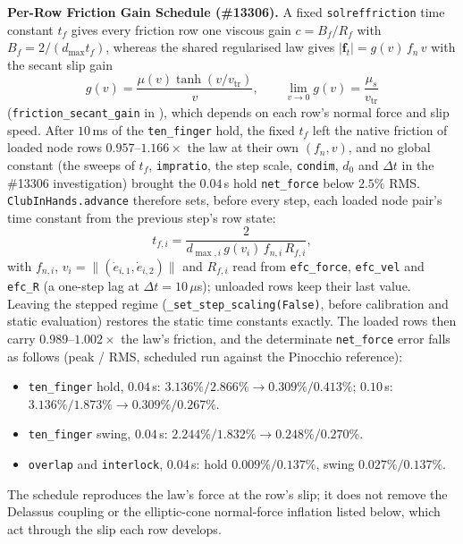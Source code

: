 \documentclass[11pt,a4paper]{article}
\begin{document}
\textbf{Per-Row Friction Gain Schedule (\#13306).} A fixed \texttt{solreffriction} time constant $t_f$ gives every
friction row one viscous gain $c = B_f/R_f$ with $B_f = 2/(d_{\max} t_f)$, whereas the shared regularised law gives
$|\mathbf{f}_t| = g(v)\,f_n\,v$ with the secant slip gain
\begin{equation}
g(v) = \frac{\mu(v)\tanh(v/v_{\mathrm{tr}})}{v}, \qquad \lim_{v \to 0} g(v) = \frac{\mu_s}{v_{\mathrm{tr}}}
\end{equation}
(\texttt{friction\_secant\_gain} in ), which depends on each
row's normal force and slip speed. After $10$\,ms of the \texttt{ten\_finger} hold, the fixed $t_f$ left the native friction
of loaded node rows $0.957$--$1.166\times$ the law at their own $(f_n, v)$, and no global constant (the sweeps of $t_f$,
\texttt{impratio}, the step scale, \texttt{condim}, $d_0$ and $\Delta t$ in the \#13306 investigation) brought the $0.04$\,s
hold \texttt{net\_force} below $2.5\%$ RMS. \texttt{ClubInHands.advance} therefore sets, before every step, each loaded node
pair's time constant from the previous step's row state:
\begin{equation}
t_{f,i} = \frac{2}{d_{\max,i}\, g(v_i)\, f_{n,i}\, R_{f,i}},
\end{equation}
with $f_{n,i}$, $v_i = \|(\dot{e}_{i,1}, \dot{e}_{i,2})\|$ and $R_{f,i}$ read from \texttt{efc\_force}, \texttt{efc\_vel} and
\texttt{efc\_R} (a one-step lag at $\Delta t = 10\,\mu$s); unloaded rows keep their last value. Leaving the stepped regime
(\texttt{\_set\_step\_scaling(False)}, before calibration and static evaluation) restores the static time constants exactly.
The loaded rows then carry $0.989$--$1.002\times$ the law's friction, and the determinate \texttt{net\_force} error falls as
follows (peak / RMS, scheduled run against the Pinocchio reference):
\begin{itemize}[leftmargin=*,noitemsep]
\item \texttt{ten\_finger} hold, $0.04$\,s: $3.136\% / 2.866\% \to 0.309\% / 0.413\%$; $0.10$\,s: $3.136\% / 1.873\% \to 0.309\% / 0.267\%$.
\item \texttt{ten\_finger} swing, $0.04$\,s: $2.244\% / 1.832\% \to 0.248\% / 0.270\%$.
\item \texttt{overlap} and \texttt{interlock}, $0.04$\,s: hold $0.009\% / 0.137\%$, swing $0.027\% / 0.137\%$.
\end{itemize}
The schedule reproduces the law's force at the row's slip; it does not remove the Delassus coupling or the elliptic-cone
normal-force inflation listed below, which act through the slip each row develops.
\end{document}

